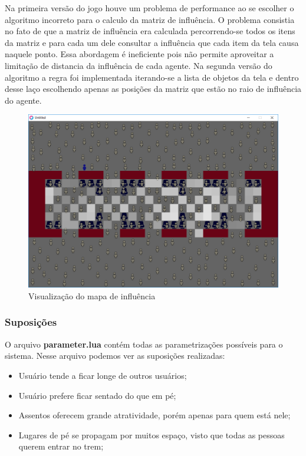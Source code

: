 \documentclass[a4paper]{article}
\begin{document}
Na primeira versão do jogo houve um problema de performance ao se escolher o algoritmo incorreto para o calculo da matriz de influência. O problema consistia no fato de que a matriz de influência era calculada percorrendo-se todos os itens da matriz e para cada um dele consultar a influência que cada item da tela causa naquele ponto. Essa abordagem é ineficiente pois não permite aproveitar a limitação de distancia da influência de cada agente. Na segunda versão do algoritmo a regra foi implementada iterando-se a lista de objetos da tela e dentro desse laço escolhendo apenas as posições da matriz que estão no raio de influência do agente.

\begin{figure}
\centering
\includegraphics[width=1\textwidth]{influence-map.png}
\caption{\label{fig:influence-map} Visualização do mapa de influência}
\end{figure}

\subsubsection{Suposições}

O arquivo \textbf{parameter.lua} contém todas as parametrizações possíveis para o sistema. Nesse arquivo podemos ver as suposições realizadas:

\begin{itemize}
\item Usuário tende a ficar longe de outros usuários;
\item Usuário prefere ficar sentado do que em pé;
\item Assentos oferecem grande atratividade, porém apenas para quem está nele;
\item Lugares de pé se propagam por muitos espaço, visto que todas as pessoas querem entrar no trem;
\end{itemize}
\end{document}
